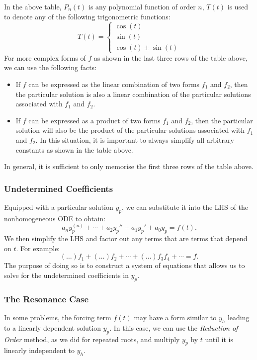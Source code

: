 \documentclass{article}
\begin{document}
In the above table, \(P_n\left( t \right)\) is any polynomial function of order \(n\),
\(T\left( t \right)\) is used to denote any of the following trigonometric functions:
\begin{equation*}
    T\left( t \right) =
    \begin{cases}
        \cos{\left( t \right)} \\
        \sin{\left( t \right)} \\
        \cos{\left( t \right)} \pm \sin{\left( t \right)}
    \end{cases}
\end{equation*}
For more complex forms of \(f\) as shown in the last three rows of the table above, we can use the following facts:
\begin{itemize}
    \item If \(f\) can be expressed as the linear combination of two forms \(f_1\) and \(f_2\), then the particular solution
          is also a linear combination of the particular solutions associated with \(f_1\) and \(f_2\).
    \item If \(f\) can be expressed as a product of two forms \(f_1\) and \(f_2\), then the particular solution will also be
          the product of the particular solutions associated with \(f_1\) and \(f_2\).
          In this situation, it is important to always simplify all arbitrary constants as shown in the table above.
\end{itemize}
In general, it is sufficient to only memorise the first three rows of the table above.
\subsubsection{Undetermined Coefficients}
Equipped with a particular solution \(y_p\), we can substitute it into the LHS of the nonhomogeneous ODE
to obtain:
\begin{equation*}
    a_n y_p^{\left( n \right)} + \cdots + a_2 y_p'' + a_1 y_p' + a_0 y_p = f\left( t \right).
\end{equation*}
We then simplify the LHS and factor out any terms that are terms that depend on \(t\).
For example:
\begin{equation*}
    \left( \dots \right) f_1 + \left( \dots \right) f_2 + \cdots + \left( \dots \right) f_3 f_4 + \cdots = f.
\end{equation*}
The purpose of doing so is to construct a system of equations that allows us to solve for the undetermined coefficients in \(y_p\).
\subsubsection{The Resonance Case}
In some problems, the forcing term \(f\left( t \right)\) may have a form similar to
\(y_h\) leading to a linearly dependent solution \(y_p\). In this case, we can use the \emph{Reduction of Order} method, as we did for
repeated roots, and multiply \(y_p\) by \(t\) until it is linearly independent to \(y_h\).
\end{document}
